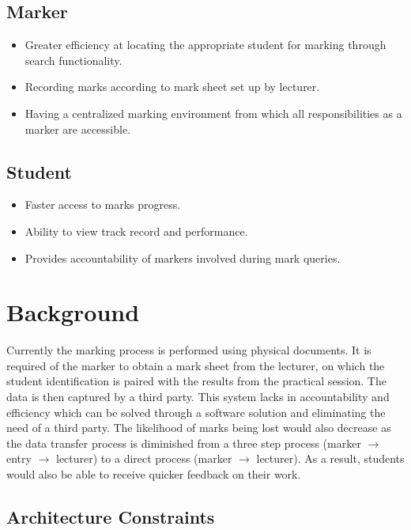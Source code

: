 \documentclass[a4paper]{article}
\begin{document}
		\subsection{Marker}
			\begin{itemize}
				\item	Greater efficiency at locating the appropriate student for marking through search functionality.
				\item	Recording marks according to mark sheet set up by lecturer.
				\item	Having a centralized marking environment from which all responsibilities as a marker are accessible.
			\end{itemize}

		\subsection{Student}
			\begin{itemize}
				\item	Faster access to marks progress.
				\item	Ability to view track record and performance.
				\item	Provides accountability of markers involved during mark queries.
			\end{itemize}

	\section{Background}

		Currently the marking process is performed using physical documents. It is required of the marker to obtain a mark sheet from the lecturer, on which the student identification is paired with the results from the practical session. The data is then captured by a third party. This system lacks in accountability and efficiency which can be solved through a software solution and eliminating the need of a third party. The likelihood of marks being lost would also decrease as the data transfer process is diminished from a three step process (marker $\rightarrow$ entry $\rightarrow$ lecturer) to a direct process (marker $\rightarrow$ lecturer). As a result, students would also be able to receive quicker feedback on their work.

		

		\subsection{Architecture Constraints}
		
\end{document}
